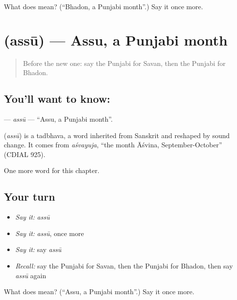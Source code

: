 \begin{tcolorbox}[breakable,colback=teal!4,colframe=teal!35!black,title={Before you move on}]
What does  mean? (\textquotedblleft{}Bhadon, a Punjabi month\textquotedblright{}.) Say it once more.
\end{tcolorbox}
\section[\texorpdfstring{\pa{ਅੱਸੂ} (assū)}{ਅੱਸੂ (assū)}]{ (assū) — Assu, a Punjabi month}

\label{lesson:PA-C104-assu}



\begin{quote}
Before the new one: say the Punjabi for Savan, then the Punjabi for Bhadon.
\end{quote}

\subsection*{You'll want to know: }
\textbf{} — \emph{assū} — \textquotedblleft{}Assu, a Punjabi month\textquotedblright{}.

\begin{cousinweb}
\textbf{} (\emph{assū}) is a tadbhava, a word inherited from Sanskrit and reshaped by sound change. It comes from \emph{aśvayuja}, \textquotedblleft{}the month Āśvina, September-October\textquotedblright{} (CDIAL 925).
\end{cousinweb}

\begin{grammarlens}[title={What you've built}]
One more word for this chapter.
\end{grammarlens}

\subsection*{Your turn}
\begin{itemize}
\raggedright
  \item \emph{Say it:} \emph{assū}
  \item \emph{Say it:} \emph{assū}, once more
  \item \emph{Say it:} say \emph{assū}
  \item \emph{Recall:} say the Punjabi for Savan, then the Punjabi for Bhadon, then say \emph{assū} again
\end{itemize}

\begin{tcolorbox}[breakable,colback=teal!4,colframe=teal!35!black,title={Before you move on}]
What does  mean? (\textquotedblleft{}Assu, a Punjabi month\textquotedblright{}.) Say it once more.
\end{tcolorbox}
